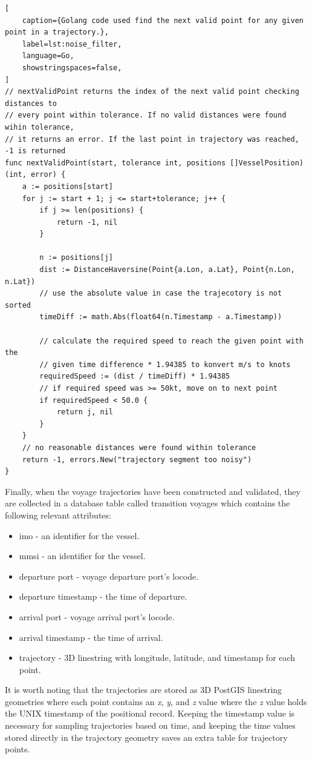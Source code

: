 \begin{lstlisting}[
    caption={Golang code used find the next valid point for any given point in a trajectory.},
    label=lst:noise_filter,
    language=Go,
    showstringspaces=false,
]
// nextValidPoint returns the index of the next valid point checking distances to
// every point within tolerance. If no valid distances were found wihin tolerance,
// it returns an error. If the last point in trajectory was reached, -1 is returned
func nextValidPoint(start, tolerance int, positions []VesselPosition) (int, error) {
	a := positions[start]
	for j := start + 1; j <= start+tolerance; j++ {
		if j >= len(positions) {
			return -1, nil
		}

		n := positions[j]
		dist := DistanceHaversine(Point{a.Lon, a.Lat}, Point{n.Lon, n.Lat})
		// use the absolute value in case the trajecotory is not sorted
		timeDiff := math.Abs(float64(n.Timestamp - a.Timestamp))

		// calculate the required speed to reach the given point with the
		// given time difference * 1.94385 to konvert m/s to knots
		requiredSpeed := (dist / timeDiff) * 1.94385
		// if required speed was >= 50kt, move on to next point
		if requiredSpeed < 50.0 {
			return j, nil
		}
	}
	// no reasonable distances were found within tolerance
	return -1, errors.New("trajectory segment too noisy")
}
\end{lstlisting}

Finally, when the voyage trajectories have been constructed and validated, they are collected in a database table called transition voyages which contains the following relevant attributes:

\begin{itemize}
    \item imo - an identifier for the vessel.
    \item mmsi - an identifier for the vessel.
    \item departure port - voyage departure port's locode.
    \item departure timestamp - the time of departure.
    \item arrival port - voyage arrival port's locode.
    \item arrival timestamp - the time of arrival.
    \item trajectory - 3D linestring with longitude, latitude, and timestamp for each point.
\end{itemize}

It is worth noting that the trajectories are stored as 3D PostGIS linestring geometries where each point contains an \textit{x}, \textit{y}, and \textit{z} value where the \textit{z} value holds the UNIX timestamp of the positional record. Keeping the timestamp value is necessary for sampling trajectories based on time, and keeping the time values stored directly in the trajectory geometry saves an extra table for trajectory points.

